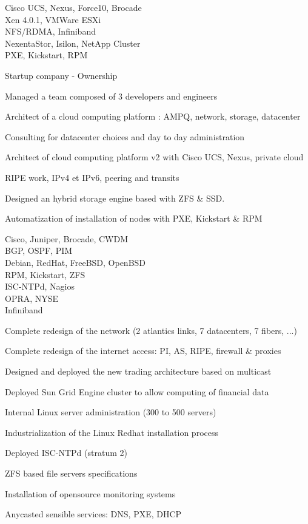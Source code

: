 \documentclass[a4paper,11pt]{cv4tw}%
\begin{document}
	{Cisco UCS, Nexus, Force10, Brocade\\Xen 4.0.1, VMWare ESXi\\NFS/RDMA, Infiniband\\NexentaStor, Isilon, NetApp Cluster\\PXE, Kickstart, RPM}
		{ Startup company - Ownership
		\begin{missions}
			\item Managed a team composed of 3 developers and engineers
			\item Architect of a cloud computing platform : AMPQ, network, storage, datacenter
			\item Consulting for datacenter choices and day to day administration
			\item Architect of cloud computing platform v2 with Cisco UCS, Nexus, private cloud
			\item RIPE work, IPv4 et IPv6, peering and transits
			\item Designed an hybrid storage engine based with ZFS \& SSD.
			\item Automatization of installation of nodes with PXE, Kickstart \& RPM
		\end{missions}
	}


	{Cisco, Juniper, Brocade, CWDM\\BGP, OSPF, PIM\\Debian, RedHat, FreeBSD, OpenBSD\\RPM, Kickstart, ZFS\\ISC-NTPd, Nagios\\OPRA, NYSE\\Infiniband}
		{
		\begin{missions}
			\item Complete redesign of the network (2 atlantics links, 7 datacenters, 7 fibers, ...)
			\item Complete redesign of the internet access: PI, AS, RIPE, firewall \& proxies
			\item Designed and deployed the new trading architecture based on multicast
			\item Deployed Sun Grid Engine cluster to allow computing of financial data 
			\item Internal Linux server administration (300 to 500 servers)
			\item Industrialization of the Linux Redhat installation process
			\item Deployed ISC-NTPd (stratum 2)
			\item ZFS based file servers specifications
			\item Installation of opensource monitoring systems 	
			\item Anycasted sensible services: DNS, PXE, DHCP
		\end{missions}
	}
\end{document}
